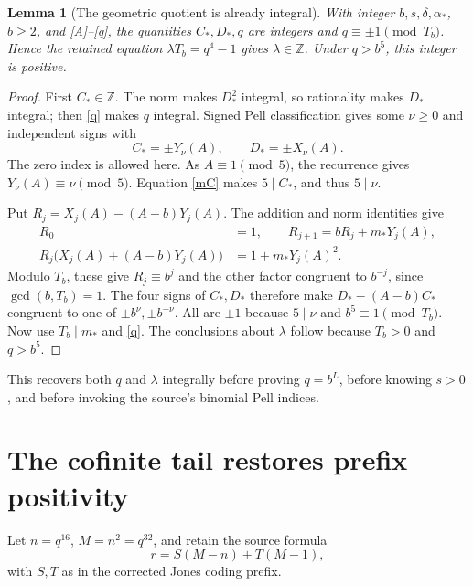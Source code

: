 \documentclass[11pt]{article}
\newtheorem{lemma}[theorem]{Lemma}
\newcommand{\Z}{\mathbb Z}\newcommand{\Q}{\mathbb Q}
\begin{document}
\begin{lemma}[The geometric quotient is already integral]\label{lambda}
With integer \(b,s,\delta,\alpha_*\), \(b\ge2\), and
\eqref{A}--\eqref{q}, the quantities \(C_*,D_*,q\) are integers
and \(q\equiv\pm1\pmod{T_b}\). Hence the retained equation
\(\lambda T_b=q^4-1\) gives \(\lambda\in\Z\). Under
\(q>b^5\), this integer is positive.
\end{lemma}
\begin{proof}
First \(C_*\in\Z\). The norm makes \(D_*^2\) integral, so
rationality makes \(D_*\) integral; then \eqref{q} makes \(q\)
integral. Signed Pell classification gives some \(\nu\ge0\) and
independent signs with
\[
                         C_*=\pm Y_\nu(A),\qquad D_*=\pm X_\nu(A).
\]
The zero index is allowed here. As \(A\equiv1\pmod5\), the
recurrence gives \(Y_\nu(A)\equiv\nu\pmod5\). Equation
\eqref{mC} makes \(5\mid C_*\), and thus \(5\mid\nu\).

Put \(R_j=X_j(A)-(A-b)Y_j(A)\). The addition and norm identities
give
\begin{equation}\label{rec}
\begin{split}
 R_0&=1,\qquad R_{j+1}=bR_j+m_*Y_j(A),\\
 R_j\bigl(X_j(A)+(A-b)Y_j(A)\bigr)&=1+m_*Y_j(A)^2.
\end{split}
\end{equation}
Modulo \(T_b\), these give \(R_j\equiv b^j\) and the other
factor congruent to \(b^{-j}\), since \(\gcd(b,T_b)=1\).
The four signs of \(C_*,D_*\) therefore make
\(D_*-(A-b)C_*\) congruent to one of
\(\pm b^\nu,\pm b^{-\nu}\). All are \(\pm1\) because
\(5\mid\nu\) and \(b^5\equiv1\pmod{T_b}\).
Now use \(T_b\mid m_*\) and \eqref{q}. The conclusions about
\(\lambda\) follow because \(T_b>0\) and \(q>b^5\).
\end{proof}

This recovers both \(q\) and \(\lambda\) integrally before proving
\(q=b^L\), before knowing \(s>0\), and before invoking the source's
binomial Pell indices.

\section{The cofinite tail restores prefix positivity}

Let \(n=q^{16}\), \(M=n^2=q^{32}\), and retain the source formula
\[
                         r=S(M-n)+T(M-1),
\]
with \(S,T\) as in the corrected Jones coding prefix.
\end{document}
